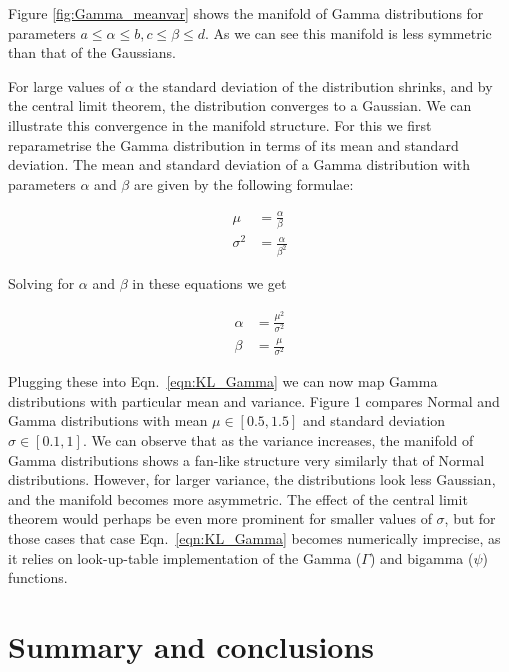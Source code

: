 Figure \ref{fig:Gamma_meanvar} shows the manifold of Gamma distributions for parameters $a \leq \alpha \leq b, c\leq \beta \leq d$. As we can see this manifold is less symmetric than that of the Gaussians.

For large values of $\alpha$ the standard deviation of the distribution shrinks, and by the central limit theorem, the distribution converges to a Gaussian. We can illustrate this convergence in the manifold structure. For this we first reparametrise the Gamma distribution in terms of its mean and standard deviation. The mean and standard deviation of a Gamma distribution with parameters $\alpha$ and $\beta$ are given by the following formulae:

\begin{align}
	\mu &= \frac{\alpha}{\beta}\\
	\sigma^2 &= \frac{\alpha}{\beta^2}
\end{align}

Solving for $\alpha$ and $\beta$ in these equations we get

\begin{align}
	\alpha &= \frac{\mu^2}{\sigma^2}\\
	\beta &= \frac{\mu}{\sigma^2}
\end{align}

Plugging these into Eqn.\ \eqref{eqn:KL_Gamma} we can now map Gamma distributions with particular mean and variance. Figure 1 compares Normal and Gamma distributions with mean $\mu\in[0.5,1.5]$ and standard deviation $\sigma\in[0.1,1]$. We can observe that as the variance increases, the manifold of Gamma distributions shows a fan-like structure very similarly that of Normal distributions. However, for larger variance, the distributions look less Gaussian, and the manifold becomes more asymmetric. The effect of the central limit theorem would perhaps be even more prominent for smaller values of $\sigma$, but for those cases that case Eqn.\ \eqref{eqn:KL_Gamma} becomes numerically imprecise, as it relies on look-up-table implementation of the Gamma ($\Gamma$) and bigamma ($\psi$) functions.

\section{Summary and conclusions}

